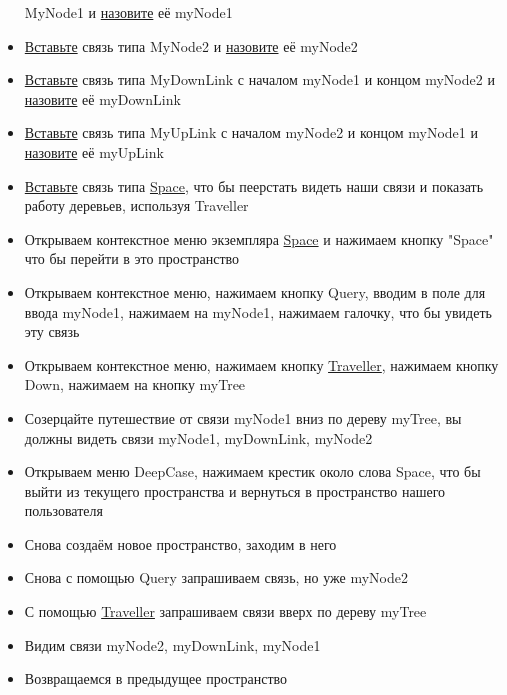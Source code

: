\documentclass{article}
\begin{document}
\begin{itemize}
        MyNode1
        и \hyperlink{FAQ.HowToSetName}{назовите} её myNode1
  \item \hyperlink{DeepCase.InsertLink.Description}{Вставьте} связь типа
        MyNode2
        и \hyperlink{FAQ.HowToSetName}{назовите} её myNode2
  \item \hyperlink{DeepCase.InsertLink.Description}{Вставьте} связь типа
        MyDownLink с началом myNode1 и концом myNode2 и
        \hyperlink{FAQ.HowToSetName}{назовите} её myDownLink
  \item \hyperlink{DeepCase.InsertLink.Description}{Вставьте} связь типа
        MyUpLink с началом myNode2 и концом myNode1 и
        \hyperlink{FAQ.HowToSetName}{назовите} её myUpLink
  \item \hyperlink{DeepCase.InsertLink.Description}{Вставьте} связь типа
        \hyperlink{Core.Space.Description}{Space}, что бы пеерстать видеть
        наши
        связи и показать
        работу деревьев, используя Traveller
  \item Открываем контекстное меню экземпляра
        \hyperlink{Core.Space.Description}{Space} и
        нажимаем кнопку "Space" что бы перейти в это пространство
  \item Открываем контекстное меню, нажимаем кнопку Query, вводим в поле
        для
        ввода myNode1, нажимаем на myNode1, нажимаем галочку, что бы
        увидеть
        эту связь
  \item Открываем контекстное меню, нажимаем кнопку
        \hyperlink{Traveller.Description}{Traveller}, нажимаем кнопку Down,
        нажимаем на
        кнопку
        myTree
  \item Созерцайте путешествие от связи myNode1 вниз по дереву myTree, вы
        должны видеть связи myNode1, myDownLink, myNode2
  \item Открываем меню DeepCase, нажимаем крестик около слова Space, что бы
        выйти из текущего пространства и вернуться в пространство нашего
        пользователя
  \item Снова создаём новое пространство, заходим в него
  \item Снова с помощью Query запрашиваем связь, но уже myNode2
  \item С помощью \hyperlink{Traveller.Description}{Traveller} запрашиваем
        связи вверх
        по дереву myTree
  \item Видим связи myNode2, myDownLink, myNode1
  \item Возвращаемся в предыдущее пространство
\end{itemize}
\end{document}
